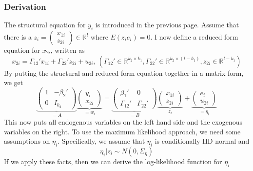 \documentclass[12pt]{article}
\theoremstyle{definition}
\theoremstyle{property}
\theoremstyle{assumption}
\theoremstyle{example}
\theoremstyle{comment}
\begin{document}
\subsubsection{Derivation}
The structural equation for $y_i$ is introduced in the previous page. Assume that there is a $z_i = \begin{pmatrix} x_{1i}\\ z_{2i}\end{pmatrix}\in\mathbb{R}^l$ where $E(z_ie_i)=0$. I now define a reduced form equation for $x_{2i}$, written as
\[
x_{2i}=\Gamma_{12}'x_{1i}+\Gamma_{22}'z_{2i}+u_{2i},\  (\Gamma_{12}'\in\mathbb{R}^{k_2\times k_1}, \Gamma_{22}'\in\mathbb{R}^{k_2\times (l-k_1)},z_{2i}\in\mathbb{R}^{l-k_1})
\]
By putting the structural and reduced form equation together in a matrix form, we get
\[
\underbrace{\begin{pmatrix}1 &- \beta_2' \\ 0  & I_{k_2} \end{pmatrix}}_{=A}\underbrace{\begin{pmatrix} y_i \\ x_{2i} \end{pmatrix}}_{=w_i}
= \underbrace{\begin{pmatrix}\beta_1' &0 \\ \Gamma_{12}'  & \Gamma_{22}' \end{pmatrix}}_{=B}\underbrace{\begin{pmatrix} x_{1i} \\ z_{2i} \end{pmatrix}}_{z_i} + \underbrace{\begin{pmatrix} e_i \\ u_{2i} \end{pmatrix}}_{=\eta_i}
\]
This now puts all endogenous variables on the left hand side and the exogenous variables on the right. To use the maximum likelihood approach, we need some assumptions on $\eta_i$. Specifically, we assume that $\eta_i$ is conditionally IID normal and
\[
\eta_i |z_i\sim N(0,\Sigma_\eta)
\]
If we apply these facts, then we can derive the log-likelihood function for $\eta_i$
\end{document}
